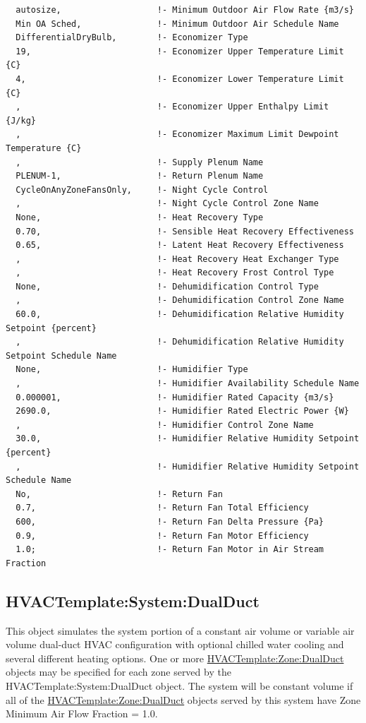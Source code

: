 \begin{lstlisting}
  autosize,                   !- Minimum Outdoor Air Flow Rate {m3/s}
  Min OA Sched,               !- Minimum Outdoor Air Schedule Name
  DifferentialDryBulb,        !- Economizer Type
  19,                         !- Economizer Upper Temperature Limit {C}
  4,                          !- Economizer Lower Temperature Limit {C}
  ,                           !- Economizer Upper Enthalpy Limit {J/kg}
  ,                           !- Economizer Maximum Limit Dewpoint Temperature {C}
  ,                           !- Supply Plenum Name
  PLENUM-1,                   !- Return Plenum Name
  CycleOnAnyZoneFansOnly,     !- Night Cycle Control
  ,                           !- Night Cycle Control Zone Name
  None,                       !- Heat Recovery Type
  0.70,                       !- Sensible Heat Recovery Effectiveness
  0.65,                       !- Latent Heat Recovery Effectiveness
  ,                           !- Heat Recovery Heat Exchanger Type
  ,                           !- Heat Recovery Frost Control Type
  None,                       !- Dehumidification Control Type
  ,                           !- Dehumidification Control Zone Name
  60.0,                       !- Dehumidification Relative Humidity Setpoint {percent}
  ,                           !- Dehumidification Relative Humidity Setpoint Schedule Name
  None,                       !- Humidifier Type
  ,                           !- Humidifier Availability Schedule Name
  0.000001,                   !- Humidifier Rated Capacity {m3/s}
  2690.0,                     !- Humidifier Rated Electric Power {W}
  ,                           !- Humidifier Control Zone Name
  30.0,                       !- Humidifier Relative Humidity Setpoint {percent}
  ,                           !- Humidifier Relative Humidity Setpoint Schedule Name
  No,                         !- Return Fan
  0.7,                        !- Return Fan Total Efficiency
  600,                        !- Return Fan Delta Pressure {Pa}
  0.9,                        !- Return Fan Motor Efficiency
  1.0;                        !- Return Fan Motor in Air Stream Fraction
\end{lstlisting}

\subsection{HVACTemplate:System:DualDuct}\label{hvactemplatesystemdualduct}

This object simulates the system portion of a constant air volume or variable air volume dual-duct HVAC configuration with optional chilled water cooling and several different heating options. One or more \hyperref[hvactemplatezonedualduct]{HVACTemplate:Zone:DualDuct} objects may be specified for each zone served by the HVACTemplate:System:DualDuct object. The system will be constant volume if all of the \hyperref[hvactemplatezonedualduct]{HVACTemplate:Zone:DualDuct} objects served by this system have Zone Minimum Air Flow Fraction = 1.0.

